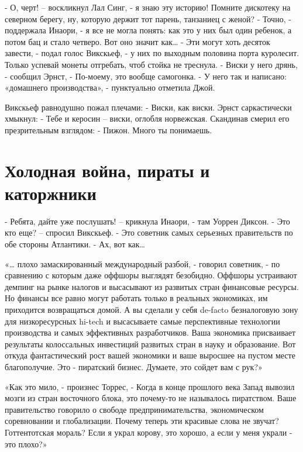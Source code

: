 \documentclass[10pt,final]{book}
\begin{document}
- О, черт! -- воскликнул Лал Синг, - я знаю эту историю! Помните дискотеку на северном берегу, ну, которую держит тот парень, танзаниец с женой?
- Точно, - поддержала Инаори, - я все не могла понять: как это у них был один ребенок, а потом бац и стало четверо. Вот оно значит как\ldots{}
- Эти могут хоть десяток завести, - подал голос Викскьеф, - у них по выходным половина порта куролесит. Только успевай монеты отгребать, чтоб стойка не треснула.
- Виски у него дрянь, - сообщил Эрнст, - По-моему, это вообще самогонка.
- У него так и написано: «домашнего производства», - пунктуально отметила Джой.

Викскьеф равнодушно пожал плечами:
- Виски, как виски.
Эрнст саркастически хмыкнул:
- Тебе и керосин -- виски, оглобля норвежская.
Скандинав смерил его презрительным взглядом:
- Пижон. Много ты понимаешь.



\chapter{Холодная война, пираты и каторжники}


- Ребята, дайте уже послушать! -- крикнула Инаори, - там Уоррен Диксон.
- Это кто еще? -- спросил Викскьеф.
- Это советник самых серьезных правительств по обе стороны Атлантики.
- Ах, вот как\ldots{}

«\ldots{} плохо замаскированный международный разбой, - говорил советник, - по сравнению с которым даже оффшоры выглядят безобидно. Оффшоры устраивают демпинг на рынке налогов и высасывают из развитых стран финансовые ресурсы. Но финансы все равно могут работать только в реальных экономиках, им приходится возвращаться домой. А вы сделали у себя de-facto безналоговую зону для низкоресурсных hi-tech и высасываете самые перспективные технологии производства и самых эффективных разработчиков. Ваша экономика присваивает результаты колоссальных инвестиций развитых стран в науку и образование. Вот откуда фантастический рост вашей экономики и ваше выросшее на пустом месте благополучие. Это - пиратский бизнес. Думаете, это сойдет вам с рук?»

«Как это мило, - произнес Торрес, - Когда в конце прошлого века Запад вывозил мозги из стран восточного блока, это почему-то не называлось пиратством. Ваше правительство говорило о свободе предпринимательства, экономическом соревновании и глобализации. Почему теперь эти красивые слова не звучат? Готтентотская мораль? Если я украл корову, это хорошо, а если у меня украли - это плохо?»
\end{document}
